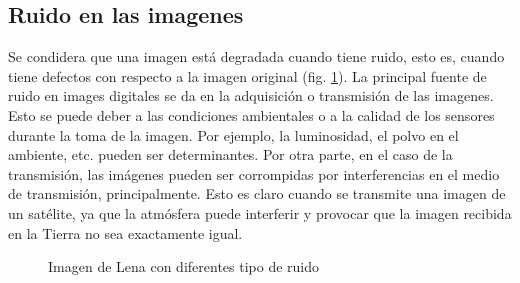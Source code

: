\documentclass[main]{subfiles}
\begin{document}
\subsection{Ruido en las imagenes}\label{sec:ruido}
Se condidera que una imagen está degradada cuando tiene ruido, esto es, cuando tiene defectos con respecto a la imagen original (fig. \ref{fig:defruido}). La principal fuente de ruido en images digitales se da en la adquisición o transmisión de las imagenes. Esto se puede deber a las condiciones ambientales o a la calidad de los sensores durante la toma de la imagen. Por ejemplo, la luminosidad, el polvo en el ambiente, etc. pueden ser determinantes. Por otra parte, en el caso de la transmisión, las imágenes pueden ser corrompidas por interferencias en el medio de transmisión, principalmente. Esto es claro cuando se transmite una imagen de un satélite, ya que la atmósfera puede interferir y provocar que la imagen recibida en la Tierra no sea exactamente igual.
\begin{figure}
\centering
    \quad
    \quad
    \caption{Imagen de Lena con diferentes tipo de ruido}
    \label{fig:defruido}
\end{figure}
\end{document}
